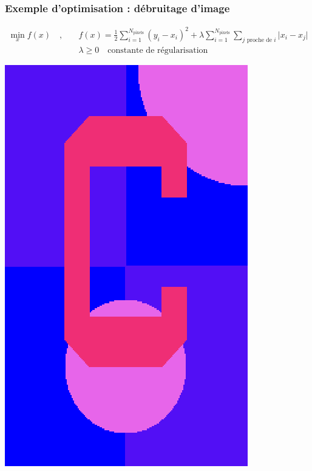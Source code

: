 \documentclass[12pt]{beamer}
\begin{document}
\begin{frame}
\begin{itemize}
\begin{frame}
\frametitle{Exemple d'optimisation : débruitage d'image}
\vspace{-0.5cm}
\begin{equation*}
\begin{split}
\min_x f(x) \quad,\quad & f(x) = \frac{1}{2}\sum_{i=1}^{N_{\text{pixels}}} (y_i - x_i)^2 + 
\lambda \sum_{i=1}^{N_{\text{pixels}}} \sum_{j \text{ proche de } i} \lvert x_i - x_j \rvert \\
& \lambda \ge 0 \quad\text{constante de régularisation}
\end{split}
\end{equation*}
\begin{center}
\begin{minipage}[t]{0.2\textwidth}
\includegraphics[width=\textwidth]{c_clean.png} \\

\end{minipage}
\end{center}
\end{frame}
\end{itemize}
\end{frame}
\end{document}
